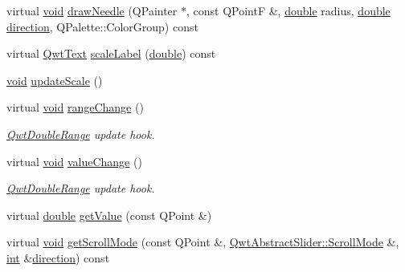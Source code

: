 \begin{DoxyCompactItemize}
\item 
virtual \hyperlink{group___u_a_v_objects_plugin_ga444cf2ff3f0ecbe028adce838d373f5c}{void} \hyperlink{class_qwt_dial_ad287b8e8d3f5453c9f7a317d40d35162}{draw\-Needle} (Q\-Painter $\ast$, const Q\-Point\-F \&, \hyperlink{_super_l_u_support_8h_a8956b2b9f49bf918deed98379d159ca7}{double} radius, \hyperlink{_super_l_u_support_8h_a8956b2b9f49bf918deed98379d159ca7}{double} \hyperlink{class_qwt_dial_a7502d5cebc37d6a7160b74a6f67dfe55}{direction}, Q\-Palette\-::\-Color\-Group) const 
\item 
virtual \hyperlink{class_qwt_text}{Qwt\-Text} \hyperlink{class_qwt_dial_ab91f5aa6c54349d735fe22acd4f5a2e1}{scale\-Label} (\hyperlink{_super_l_u_support_8h_a8956b2b9f49bf918deed98379d159ca7}{double}) const 
\item 
\hyperlink{group___u_a_v_objects_plugin_ga444cf2ff3f0ecbe028adce838d373f5c}{void} \hyperlink{class_qwt_dial_a6cff8d50590daa07b7530d2fd13ed3af}{update\-Scale} ()
\item 
virtual \hyperlink{group___u_a_v_objects_plugin_ga444cf2ff3f0ecbe028adce838d373f5c}{void} \hyperlink{class_qwt_dial_a81b21a9954c5561af549214ee153573c}{range\-Change} ()
\begin{DoxyCompactList}\small\item\em \hyperlink{class_qwt_double_range}{Qwt\-Double\-Range} update hook. \end{DoxyCompactList}\item 
virtual \hyperlink{group___u_a_v_objects_plugin_ga444cf2ff3f0ecbe028adce838d373f5c}{void} \hyperlink{class_qwt_dial_ad8803d79d9fbefdae55907728bb01894}{value\-Change} ()
\begin{DoxyCompactList}\small\item\em \hyperlink{class_qwt_double_range}{Qwt\-Double\-Range} update hook. \end{DoxyCompactList}\item 
virtual \hyperlink{_super_l_u_support_8h_a8956b2b9f49bf918deed98379d159ca7}{double} \hyperlink{class_qwt_dial_a7acb904d2f2e9b20178cd9a9d9b37d3f}{get\-Value} (const Q\-Point \&)
\item 
virtual \hyperlink{group___u_a_v_objects_plugin_ga444cf2ff3f0ecbe028adce838d373f5c}{void} \hyperlink{class_qwt_dial_a26e8e2fe68799a5ee91acd99e81177e9}{get\-Scroll\-Mode} (const Q\-Point \&, \hyperlink{class_qwt_abstract_slider_ae4c0c4844ac6a35356f3c529a8eae154}{Qwt\-Abstract\-Slider\-::\-Scroll\-Mode} \&, \hyperlink{ioapi_8h_a787fa3cf048117ba7123753c1e74fcd6}{int} \&\hyperlink{class_qwt_dial_a7502d5cebc37d6a7160b74a6f67dfe55}{direction}) const 
\end{DoxyCompactItemize}

